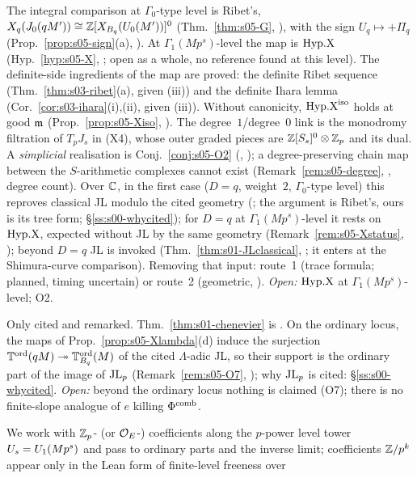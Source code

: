 \begin{description}[leftmargin=0pt,itemsep=4pt]
\item[(a) Over $\C$.] The integral comparison at $\Gamma_0$-type level is Ribet's, $X_q(J_0(qM'))\cong\mathbb{Z}[X_{B_q}(U_0(M'))]^0$
  (Thm.~\ref{thm:s05-G}, \stcited), with the sign $U_q\mapsto+\Pi_q$ (Prop.~\ref{prop:s05-sign}(a), \stpmc). At $\Gamma_1(Mp^s)$-level
  the map is $\mathrm{Hyp.X}$ (Hyp.~\ref{hyp:s05-X}, \sthyp; open as a whole, no reference found at this level). The definite-side
  ingredients of the map are proved: the definite Ribet sequence (Thm.~\ref{thm:s03-ribet}(a), \stproved{} given (iii)) and the
  definite Ihara lemma (Cor.~\ref{cor:s03-ihara}(i),(ii), \stproved{} given (iii)). Without canonicity, $\mathrm{Hyp.X}^{\mathrm{iso}}$ holds at good
  $\mathfrak{m}$ (Prop.~\ref{prop:s05-Xiso}, \stpmc). The degree~$1$/degree~$0$ link is the monodromy filtration of $T_pJ_s$ in (X4), whose
  outer graded pieces are $\mathbb{Z}[S_s]^0\otimes\mathbb{Z}_p$ and its dual. A \emph{simplicial} realisation is Conj.~\ref{conj:s05-O2} (\stconj,
  \stopen); a degree-preserving chain map between the $S$-arithmetic complexes cannot exist (Remark~\ref{rem:s05-degree}, \stsketch,
  degree count). Over $\C$, in the first case ($D=q$, weight~$2$, $\Gamma_0$-type level) this reproves classical JL modulo the cited geometry
  (; the argument is Ribet's, ours is its tree form; \S\ref{ss:s00-whycited}); for $D=q$ at $\Gamma_1(Mp^s)$-level it rests on $\mathrm{Hyp.X}$, expected without JL by the same
  geometry (Remark~\ref{rem:s05-Xstatus}, \stexp); beyond $D=q$ JL is invoked (Thm.~\ref{thm:s01-JLclassical}, \stcited; it enters
  at the Shimura-curve comparison). Removing that input: route~1 (trace formula; planned, timing uncertain) or route~2
  (geometric, \stopen).
  \emph{Open:} $\mathrm{Hyp.X}$ at $\Gamma_1(Mp^s)$-level; O2.
\item[(b) Chenevier.] Only cited and remarked. Thm.~\ref{thm:s01-chenevier} is \stcited. On the ordinary locus, the maps of
  Prop.~\ref{prop:s05-Xlambda}(d) induce the surjection $\mathbb{T}^{\mathrm{ord}}(qM)\twoheadrightarrow\mathbb{T}^{\mathrm{ord}}_{B_q}(M)$ of the cited $\Lambda$-adic
  JL, so their support is the ordinary part of the image of $\mathrm{JL}_p$ (Remark~\ref{rem:s05-O7}, \stsketch); why $\mathrm{JL}_p$ is cited:
  \S\ref{ss:s00-whycited}. \emph{Open:} beyond the
  ordinary locus nothing is claimed (O7); there is no finite-slope analogue of $e$ killing $\Phi^{\mathrm{comb}}$.
\item[(c) $\Lambda$-adic.] We work with $\mathbb{Z}_p$- (or $\mathcal{O}_E$-) coefficients along the $p$-power level tower $U_s=U_1(Mp^s)$ and pass
  to ordinary parts and the inverse limit; coefficients $\mathbb{Z}/p^k$ appear only in the Lean form of finite-level freeness over

\end{description}
